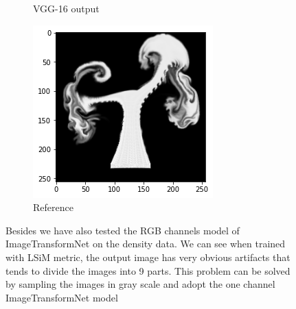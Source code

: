\documentclass[a4paper,12pt,twoside]{report}
\begin{document}
\begin{figure}
\begin{subfigure}{0.32\textwidth}
		\caption{VGG-16 output}
	\end{subfigure}
	\begin{subfigure}{0.32\textwidth}
		\centering
		\includegraphics[scale=0.5]{superresolution/checkerboard_ref.png}
		\caption{Reference}
	\end{subfigure}
	\caption{Besides we have also tested the RGB channels model of ImageTransformNet on the density data. We can see when trained with LSiM metric, the output image has very obvious artifacts that tends to divide the images into 9 parts. This problem can be solved by sampling the images in gray scale and adopt the one channel ImageTransformNet model}
	\label{super rgb}
\end{figure}
\end{document}
